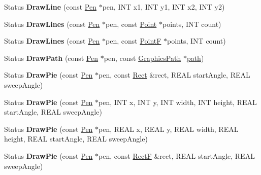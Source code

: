 \begin{DoxyCompactItemize}
\mbox{\label{class_graphics_a3420da41b1573f9044d519f0f9801489}} 
Status {\bfseries Draw\+Line} (const \hyperlink{class_pen}{Pen} $\ast$pen, I\+NT x1, I\+NT y1, I\+NT x2, I\+NT y2)
\item 
\mbox{\label{class_graphics_a9beb5b22c7dd87bf2a50bdc34cf71358}} 
Status {\bfseries Draw\+Lines} (const \hyperlink{class_pen}{Pen} $\ast$pen, const \hyperlink{struct_point}{Point} $\ast$points, I\+NT count)
\item 
\mbox{\label{class_graphics_a6f924472953344695a67dfbf17d065bb}} 
Status {\bfseries Draw\+Lines} (const \hyperlink{class_pen}{Pen} $\ast$pen, const \hyperlink{struct_point_f}{PointF} $\ast$points, I\+NT count)
\item 
\mbox{\label{class_graphics_a7361cdd9a855e4837e600f6d78c7d337}} 
Status {\bfseries Draw\+Path} (const \hyperlink{class_pen}{Pen} $\ast$pen, const \hyperlink{class_graphics_path}{Graphics\+Path} $\ast$\hyperlink{structpath}{path})
\item 
\mbox{\label{class_graphics_a7f3d25289d97fb66fab216402041d20e}} 
Status {\bfseries Draw\+Pie} (const \hyperlink{class_pen}{Pen} $\ast$pen, const \hyperlink{struct_rect}{Rect} \&rect, R\+E\+AL start\+Angle, R\+E\+AL sweep\+Angle)
\item 
\mbox{\label{class_graphics_a384f323d235aebcd6e9ac57c5446dc0f}} 
Status {\bfseries Draw\+Pie} (const \hyperlink{class_pen}{Pen} $\ast$pen, I\+NT x, I\+NT y, I\+NT width, I\+NT height, R\+E\+AL start\+Angle, R\+E\+AL sweep\+Angle)
\item 
\mbox{\label{class_graphics_add9524f791ace49184aa914ecb3b70cb}} 
Status {\bfseries Draw\+Pie} (const \hyperlink{class_pen}{Pen} $\ast$pen, R\+E\+AL x, R\+E\+AL y, R\+E\+AL width, R\+E\+AL height, R\+E\+AL start\+Angle, R\+E\+AL sweep\+Angle)
\item 
\mbox{\label{class_graphics_a37899e7b1d34a124cb9dfcdf3c241b6c}} 
Status {\bfseries Draw\+Pie} (const \hyperlink{class_pen}{Pen} $\ast$pen, const \hyperlink{struct_rect_f}{RectF} \&rect, R\+E\+AL start\+Angle, R\+E\+AL sweep\+Angle)
\item 

\end{DoxyCompactItemize}
